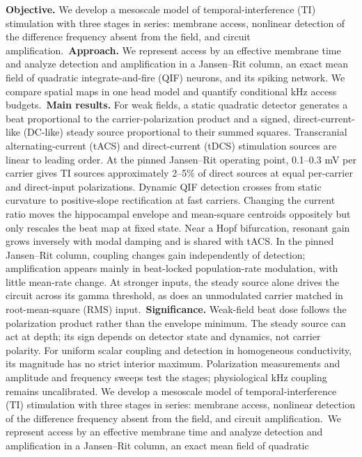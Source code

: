 \documentclass[11pt,a4paper]{article}
\newif\ifjne
\begin{document}
\noindent
\ifjne
\textbf{Objective.} We develop a mesoscale model of temporal-interference (TI) stimulation with three stages
in series: membrane access, nonlinear detection of the difference frequency absent from
the field, and circuit amplification.\
\textbf{Approach.} We represent access by an effective membrane time and analyze detection and
amplification in a Jansen--Rit column, an exact mean field of quadratic
integrate-and-fire (QIF) neurons, and its spiking network. We compare spatial maps in
one head model and quantify conditional kHz access budgets.\
\textbf{Main results.} For weak fields, a static quadratic detector generates a beat proportional to the
carrier-polarization product and a signed, direct-current-like (DC-like) steady source
proportional to their summed squares. Transcranial alternating-current (tACS) and direct-current (tDCS)
stimulation sources are linear to leading order. At the pinned
Jansen--Rit operating point, 0.1--0.3 mV per carrier gives TI sources approximately
2--5\% of direct sources at equal per-carrier and direct-input
polarizations. Dynamic QIF detection crosses from static curvature to positive-slope
rectification at fast carriers. Changing the current ratio moves the hippocampal
envelope and mean-square centroids oppositely but only rescales the beat map at
fixed state. Near a Hopf bifurcation, resonant gain grows inversely with modal damping
and is shared with tACS. In the pinned Jansen--Rit column, coupling changes gain
independently of detection; amplification appears mainly in beat-locked population-rate
modulation, with little mean-rate change. At stronger inputs, the steady source alone drives the circuit across its gamma
threshold, as does an unmodulated carrier matched in root-mean-square (RMS) input.\
\textbf{Significance.} Weak-field beat dose follows the polarization product rather than the envelope minimum.
The steady source can act at depth; its sign depends on detector state and dynamics,
not carrier polarity. For uniform scalar coupling and detection in homogeneous
conductivity, its magnitude has no strict interior maximum. Polarization measurements and amplitude and frequency sweeps test the
stages; physiological kHz coupling remains uncalibrated.
\else
We develop a mesoscale model of temporal-interference (TI) stimulation with three stages
in series: membrane access, nonlinear detection of the difference frequency absent from
the field, and circuit amplification.\ We represent access by an effective membrane time and analyze detection and
amplification in a Jansen--Rit column, an exact mean field of quadratic
\end{document}
